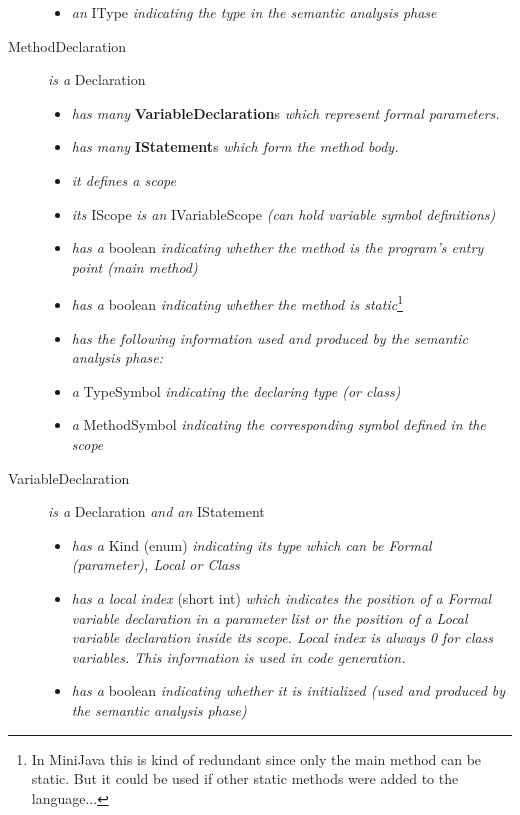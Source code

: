 \documentclass[a4paper,11pt]{article}
\begin{document}
\begin{description}
\begin{itemize}
        \item \emph{an} IType \emph{indicating the type in the semantic analysis phase}
      \end{itemize}
    \item[MethodDeclaration] \emph{is a} Declaration
      \begin{itemize}
        \item \emph{has many} \textbf{VariableDeclaration}s \emph{which represent formal parameters.}
        \item \emph{has many} \textbf{IStatement}s \emph{which form the method body.}
        \item \emph{it defines a scope}
        \item \emph{its} IScope \emph{is an} IVariableScope \emph{(can hold variable symbol definitions)}
        \item \emph{has a} boolean \emph{indicating whether the method is the program's entry point (main method)}
        \item \emph{has a} boolean \emph{indicating whether the method is static}\footnote{In MiniJava this is kind of redundant since only the main method can be static. But it could be used if other static methods were added to the language...}
        \item \emph{has the following information used and produced by the semantic analysis phase:}
        \item \emph{a} TypeSymbol \emph{indicating the declaring type (or class)}
        \item \emph{a} MethodSymbol \emph{indicating the corresponding symbol defined in the scope}
      \end{itemize}
    \item[VariableDeclaration] \emph{is a} Declaration \emph{and an} IStatement
      \begin{itemize}
        \item \emph{has a} Kind (enum) \emph{indicating its type which can be Formal (parameter), Local or Class}
        \item \emph{has a local index} (short int) \emph{which indicates the position of a Formal variable declaration in a parameter list or the position of a Local variable declaration inside its scope. Local index is always 0 for class variables. This information is used in code generation.}
        \item \emph{has a} boolean \emph{indicating whether it is initialized (used and produced by the semantic analysis phase)}
      \end{itemize}

\end{description}
\end{document}
